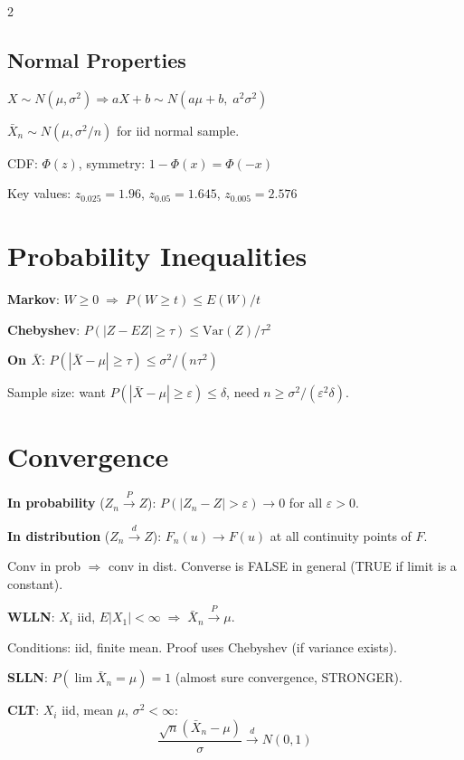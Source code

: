 \documentclass[8pt]{extarticle}
\begin{document}
\begin{multicols}{2}
\subsection{Normal Properties}

$X \sim N(\mu,\sigma^2) \Rightarrow aX+b \sim N(a\mu+b,\; a^2\sigma^2)$

$\bar X_n \sim N(\mu, \sigma^2/n)$ for iid normal sample.

CDF: $\Phi(z)$, \quad symmetry: $1-\Phi(x) = \Phi(-x)$

Key values: $z_{0.025}=1.96$, \quad $z_{0.05}=1.645$, \quad $z_{0.005}=2.576$

\section{Probability Inequalities}

\textbf{Markov}: $W \ge 0 \;\Rightarrow\; P(W \ge t) \le E(W)/t$

\textbf{Chebyshev}: $P(|Z - EZ| \ge \tau) \le \text{Var}(Z)/\tau^2$

\textbf{On $\bar X$}: $P(|\bar X - \mu| \ge \tau) \le \sigma^2/(n\tau^2)$

Sample size: want $P(|\bar X - \mu| \ge \varepsilon) \le \delta$, need $n \ge \sigma^2/(\varepsilon^2\delta)$.

\section{Convergence}

\textbf{In probability} ($Z_n \xrightarrow{P} Z$): $P(|Z_n - Z| > \varepsilon) \to 0$ for all $\varepsilon > 0$.

\textbf{In distribution} ($Z_n \xrightarrow{d} Z$): $F_n(u) \to F(u)$ at all continuity points of $F$.

Conv in prob $\Rightarrow$ conv in dist. Converse is FALSE in general (TRUE if limit is a constant).

\textbf{WLLN}: $X_i$ iid, $E|X_1|<\infty \;\Rightarrow\; \bar X_n \xrightarrow{P} \mu$.

Conditions: iid, finite mean. Proof uses Chebyshev (if variance exists).

\textbf{SLLN}: $P(\lim \bar X_n = \mu) = 1$ \quad (almost sure convergence, STRONGER).

\textbf{CLT}: $X_i$ iid, mean $\mu$, $\sigma^2<\infty$:
$$\frac{\sqrt{n}(\bar X_n - \mu)}{\sigma} \xrightarrow{d} N(0,1)$$


\end{multicols}
\end{document}
